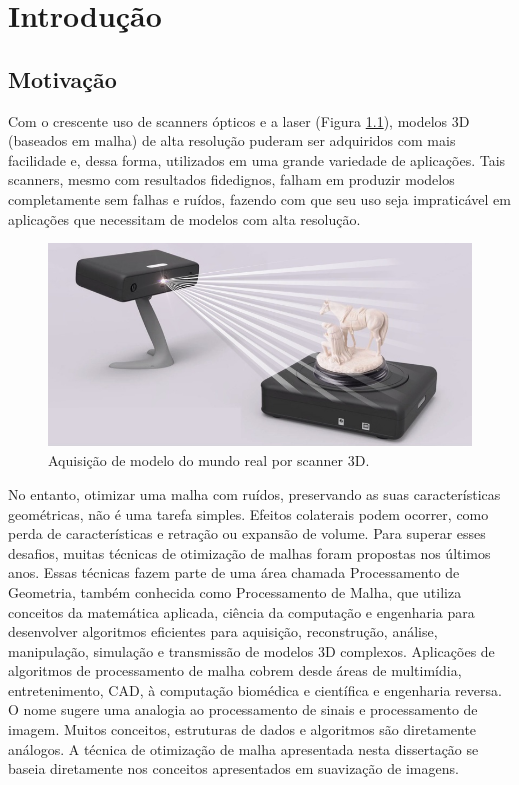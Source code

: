 \chapter{Introdução}
\label{cap:introducao}

\section{Motivação}
Com o crescente uso de scanners ópticos e a laser (Figura \ref{fig:scan3d}), modelos 3D (baseados em malha) de alta resolução puderam ser adquiridos com mais facilidade e, dessa forma, utilizados em uma grande variedade de aplicações. Tais scanners, mesmo com resultados fidedignos, falham em produzir modelos completamente sem falhas e ruídos, fazendo com que seu uso seja impraticável em aplicações que necessitam de modelos com alta resolução.
    
\begin{figure}[!ht]
\captionsetup{width=16cm}
\centering
\includegraphics[scale=0.6]{figuras/scan3d.jpg}
\caption{Aquisição de modelo do mundo real por scanner 3D.}
\label{fig:scan3d}
\end{figure}

No entanto, otimizar uma malha com ruídos, preservando as suas características geométricas, não é uma tarefa simples. Efeitos colaterais podem ocorrer, como perda de características e retração ou expansão de volume. Para superar esses desafios, muitas técnicas de otimização de malhas foram propostas nos últimos anos. Essas técnicas fazem parte de uma área chamada Processamento de Geometria, também conhecida como Processamento de Malha, que utiliza conceitos da matemática aplicada, ciência da computação e engenharia para desenvolver algoritmos eficientes para aquisição, reconstrução, análise, manipulação, simulação e transmissão de modelos 3D complexos. Aplicações de algoritmos de processamento de malha cobrem desde áreas de multimídia, entretenimento, CAD, à computação biomédica e científica e engenharia reversa. O nome sugere uma analogia ao processamento de sinais e processamento de imagem. Muitos conceitos, estruturas de dados e algoritmos são diretamente análogos. A técnica de otimização de malha apresentada nesta dissertação se baseia diretamente nos conceitos apresentados em suavização de imagens.

